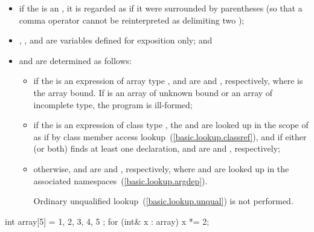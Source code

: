 \begin{itemize}
\item
if the  is an ,
it is regarded as if it were surrounded by parentheses (so that a comma operator
cannot be reinterpreted as delimiting two );

\item {}, , and  are variables defined for
exposition only; and

\item
{} and  are determined as follows:

\begin{itemize}
\item if the  is an expression of
array type ,  and  are
 and , respectively, where  is
the array bound. If  is an array of unknown bound or an array of
incomplete type, the program is ill-formed;

\item if the  is an expression of
class type , the 
 and  are looked up in the scope of 
as if by class member access lookup~(\ref{basic.lookup.classref}), and if either
(or both) finds at least one declaration,  and
 are  and ,
respectively;

\item otherwise,  and  are 
and , respectively, where  and  are looked
up in the associated namespaces~(\ref{basic.lookup.argdep}).
\begin{note} Ordinary unqualified lookup~(\ref{basic.lookup.unqual}) is not
performed. \end{note}
\end{itemize}
\end{itemize}

\begin{example}
\begin{codeblock}
int array[5] = { 1, 2, 3, 4, 5 };
for (int& x : array)
  x *= 2;
\end{codeblock}
\end{example}

